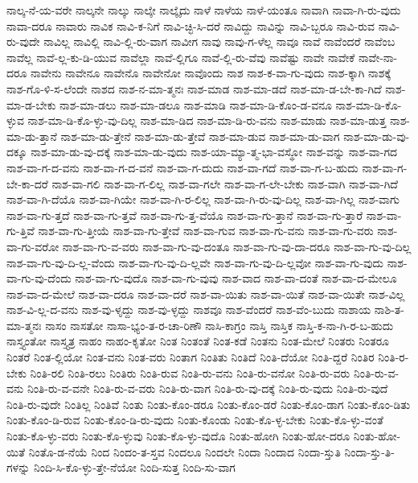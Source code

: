 {ನಾಲ್ಕ-ನೆ-ಯ-ವರೇ
ನಾಲ್ಕನೇ
ನಾಲ್ಕು
ನಾಲ್ಕೇ
ನಾಲ್ಕೈದು
ನಾಳೆ
ನಾಳೆಯ
ನಾಳೆ-ಯಂತೂ
ನಾವಾಗಿ
ನಾವಾ-ಗಿ-ರು-ವುದು
ನಾವಾ-ದರೂ
ನಾವಾರು
ನಾವಿಕ
ನಾವಿ-ಕ-ನಿಗೆ
ನಾವಿ-ಚ್ಛಿ-ಸಿ-ದರೆ
ನಾವಿದ್ದು
ನಾವಿನ್ನು
ನಾವಿ-ಬ್ಬರೂ
ನಾವಿ-ರುವ
ನಾವಿ-ರು-ವುದೇ
ನಾವಿಲ್ಲ
ನಾವಿಲ್ಲಿ
ನಾವಿ-ಲ್ಲಿ-ರು-ವಾಗ
ನಾವೀಗ
ನಾವು
ನಾವು-ಗ-ಳೆಲ್ಲ
ನಾವೂ
ನಾವೆ
ನಾವೆಂದರೆ
ನಾವೆಂಬ
ನಾವೆಲ್ಲ
ನಾವೆ-ಲ್ಲ-ಕು-ಡಿ-ಯುವ
ನಾವೆಲ್ಲಾ
ನಾವೆ-ಲ್ಲಿಗೂ
ನಾವೆ-ಲ್ಲಿ-ರು-ವೆವು
ನಾವೆಷ್ಟು
ನಾವೇ
ನಾವೇಕೆ
ನಾವೇ-ನಾ-ದರೂ
ನಾವೇನು
ನಾವೇನೂ
ನಾವೇನೊ
ನಾವೇನೋ
ನಾವೊಂದು
ನಾಶ
ನಾಶ-ಕ-ವಾ-ಗು-ವುದು
ನಾಶ-ಕ್ಕಾಗಿ
ನಾಶಕ್ಕೆ
ನಾಶ-ಗೊ-ಳಿ-ಸ-ಲೆಂದೇ
ನಾಶದ
ನಾಶ-ನ-ಮಾ-ತ್ಮನಃ
ನಾಶ-ಮಾಡ
ನಾಶ-ಮಾ-ಡದೆ
ನಾಶ-ಮಾ-ಡ-ಬೇ-ಕಾ-ಗಿದೆ
ನಾಶ-ಮಾ-ಡ-ಬೇಕು
ನಾಶ-ಮಾ-ಡಲು
ನಾಶ-ಮಾ-ಡಲೂ
ನಾಶ-ಮಾಡಿ
ನಾಶ-ಮಾ-ಡಿ-ಕೊಂ-ಡ-ವನೂ
ನಾಶ-ಮಾ-ಡಿ-ಕೊ-ಳ್ಳುವ
ನಾಶ-ಮಾ-ಡಿ-ಕೊ-ಳ್ಳು-ವು-ದಿಲ್ಲ
ನಾಶ-ಮಾ-ಡಿದ
ನಾಶ-ಮಾ-ಡಿ-ರು-ವನು
ನಾಶ-ಮಾಡು
ನಾಶ-ಮಾ-ಡುತ್ತ
ನಾಶ-ಮಾ-ಡು-ತ್ತಾನೆ
ನಾಶ-ಮಾ-ಡು-ತ್ತೇನೆ
ನಾಶ-ಮಾ-ಡು-ತ್ತೇವೆ
ನಾಶ-ಮಾ-ಡುವ
ನಾಶ-ಮಾ-ಡು-ವಾಗ
ನಾಶ-ಮಾ-ಡು-ವು-ದಕ್ಕೂ
ನಾಶ-ಮಾ-ಡು-ವು-ದಕ್ಕೆ
ನಾಶ-ಮಾ-ಡು-ವುದು
ನಾಶ-ಯಾ-ಮ್ಯಾ-ತ್ಮ-ಭಾ-ವಸ್ಥೋ
ನಾಶ-ವನ್ನು
ನಾಶ-ವಾ-ಗದ
ನಾಶ-ವಾ-ಗ-ದ-ವನು
ನಾಶ-ವಾ-ಗ-ದ-ವನೆ
ನಾಶ-ವಾ-ಗ-ದುದು
ನಾಶ-ವಾ-ಗದೆ
ನಾಶ-ವಾ-ಗ-ಬ-ಹುದು
ನಾಶ-ವಾ-ಗ-ಬೇ-ಕಾ-ದರೆ
ನಾಶ-ವಾ-ಗಲಿ
ನಾಶ-ವಾ-ಗ-ಲಿಲ್ಲ
ನಾಶ-ವಾ-ಗಲೇ
ನಾಶ-ವಾ-ಗ-ಲೇ-ಬೇಕು
ನಾಶ-ವಾಗಿ
ನಾಶ-ವಾ-ಗಿದೆ
ನಾಶ-ವಾ-ಗಿ-ದೆಯೊ
ನಾಶ-ವಾ-ಗಿಯೇ
ನಾಶ-ವಾ-ಗಿ-ರ-ಲಿಲ್ಲ
ನಾಶ-ವಾ-ಗಿ-ರು-ವು-ದಿಲ್ಲ
ನಾಶ-ವಾ-ಗಿಲ್ಲ
ನಾಶ-ವಾಗು
ನಾಶ-ವಾ-ಗು-ತ್ತದೆ
ನಾಶ-ವಾ-ಗು-ತ್ತವೆ
ನಾಶ-ವಾ-ಗು-ತ್ತ-ವೆಯೊ
ನಾಶ-ವಾ-ಗು-ತ್ತಾನೆ
ನಾಶ-ವಾ-ಗು-ತ್ತಾರೆ
ನಾಶ-ವಾ-ಗು-ತ್ತಿವೆ
ನಾಶ-ವಾ-ಗು-ತ್ತೀಯೆ
ನಾಶ-ವಾ-ಗು-ತ್ತೇವೆ
ನಾಶ-ವಾ-ಗುವ
ನಾಶ-ವಾ-ಗು-ವನು
ನಾಶ-ವಾ-ಗು-ವರು
ನಾಶ-ವಾ-ಗು-ವರೋ
ನಾಶ-ವಾ-ಗು-ವ-ವರು
ನಾಶ-ವಾ-ಗು-ವು-ದಂತೂ
ನಾಶ-ವಾ-ಗು-ವು-ದಾ-ದರೂ
ನಾಶ-ವಾ-ಗು-ವು-ದಿಲ್ಲ
ನಾಶ-ವಾ-ಗು-ವು-ದಿ-ಲ್ಲ-ವೆಂದು
ನಾಶ-ವಾ-ಗು-ವು-ದಿ-ಲ್ಲವೇ
ನಾಶ-ವಾ-ಗು-ವು-ದಿ-ಲ್ಲವೋ
ನಾಶ-ವಾ-ಗು-ವುದು
ನಾಶ-ವಾ-ಗು-ವು-ದೆಂದು
ನಾಶ-ವಾ-ಗು-ವುದೊ
ನಾಶ-ವಾ-ಗು-ವುವು
ನಾಶ-ವಾದ
ನಾಶ-ವಾ-ದಂತೆ
ನಾಶ-ವಾ-ದ-ಮೇಲೂ
ನಾಶ-ವಾ-ದ-ಮೇಲೆ
ನಾಶ-ವಾ-ದರೂ
ನಾಶ-ವಾ-ದರೆ
ನಾಶ-ವಾ-ಯಿತು
ನಾಶ-ವಾ-ಯಿತೆ
ನಾಶ-ವಾ-ಯಿತೇ
ನಾಶ-ವಿಲ್ಲ
ನಾಶ-ವಿ-ಲ್ಲ-ದ-ವನು
ನಾಶ-ವು-ಳೃದ್ದು
ನಾಶ-ವು-ಳ್ಳದ್ದು
ನಾಶವೂ
ನಾಶ-ವೆಂದರೆ
ನಾಶ-ವೆಂ-ಬುದು
ನಾಶಾಯ
ನಾಶಿ-ತ-ಮಾ-ತ್ಮನಃ
ನಾಸಂ
ನಾಸತೋ
ನಾಸಾ-ಭ್ಯಂ-ತ-ರ-ಚಾ-ರಿಣೌ
ನಾಸಿ-ಕಾಗ್ರಂ
ನಾಸ್ತಿ
ನಾಸ್ತಿಕ
ನಾಸ್ತಿ-ಕ-ನಾ-ಗಿ-ರ-ಬ-ಹುದು
ನಾಸ್ತ್ಯಂತೋ
ನಾಸ್ತ್ಯತ್ರ
ನಾಹಂ
ನಾಹಂ-ಕೃತೋ
ನಿಂತ
ನಿಂತಂತೆ
ನಿಂತ-ಕಡೆ
ನಿಂತನು
ನಿಂತ-ಮೇಲೆ
ನಿಂತರು
ನಿಂತರೂ
ನಿಂತರೆ
ನಿಂತ-ಲ್ಲಿಯೋ
ನಿಂತ-ವನು
ನಿಂತ-ವರು
ನಿಂತಾಗ
ನಿಂತಿತು
ನಿಂತಿದೆ
ನಿಂತಿ-ದೆಯೋ
ನಿಂತಿ-ದ್ದರೆ
ನಿಂತಿರ
ನಿಂತಿ-ರ-ಬೇಕು
ನಿಂತಿ-ರಲಿ
ನಿಂತಿ-ರಲು
ನಿಂತಿರು
ನಿಂತಿ-ರುವ
ನಿಂತಿ-ರು-ವನು
ನಿಂತಿ-ರು-ವನೋ
ನಿಂತಿ-ರು-ವರು
ನಿಂತಿ-ರು-ವ-ವನು
ನಿಂತಿ-ರು-ವ-ವನೇ
ನಿಂತಿ-ರು-ವ-ವರು
ನಿಂತಿ-ರು-ವಾಗ
ನಿಂತಿ-ರು-ವು-ದಕ್ಕೆ
ನಿಂತಿ-ರು-ವುದು
ನಿಂತಿ-ರು-ವುದೆ
ನಿಂತಿ-ರು-ವುದೇ
ನಿಂತಿಲ್ಲ
ನಿಂತಿವೆ
ನಿಂತು
ನಿಂತು-ಕೊಂ-ಡರೂ
ನಿಂತು-ಕೊಂ-ಡರೆ
ನಿಂತು-ಕೊಂ-ಡಾಗ
ನಿಂತು-ಕೊಂ-ಡಿತು
ನಿಂತು-ಕೊಂ-ಡಿ-ರುವ
ನಿಂತು-ಕೊಂ-ಡಿ-ರು-ವುದು
ನಿಂತು-ಕೊಂಡು
ನಿಂತು-ಕೊ-ಳ್ಳ-ಬೇಕು
ನಿಂತು-ಕೊ-ಳ್ಳು-ವಂತೆ
ನಿಂತು-ಕೊ-ಳ್ಳು-ವರು
ನಿಂತು-ಕೊ-ಳ್ಳುವು
ನಿಂತು-ಕೊ-ಳ್ಳು-ವುದೊ
ನಿಂತು-ಹೋಗಿ
ನಿಂತು-ಹೋ-ದರೂ
ನಿಂತು-ಹೋ-ಯಿತೆ
ನಿಂತೊ-ಡ-ನೆಯೆ
ನಿಂದ
ನಿಂದಂ-ತ-ಸ್ತವ
ನಿಂದಲೂ
ನಿಂದಲೇ
ನಿಂದಾ
ನಿಂದಾದ
ನಿಂದಾ-ಸ್ತುತಿ
ನಿಂದಾ-ಸ್ತು-ತಿ-ಗಳನ್ನು
ನಿಂದಿ-ಸಿ-ಕೊ-ಳ್ಳು-ತ್ತೇ-ನೆಯೋ
ನಿಂದಿ-ಸುತ್ತ
ನಿಂದಿ-ಸು-ವಾಗ
}
